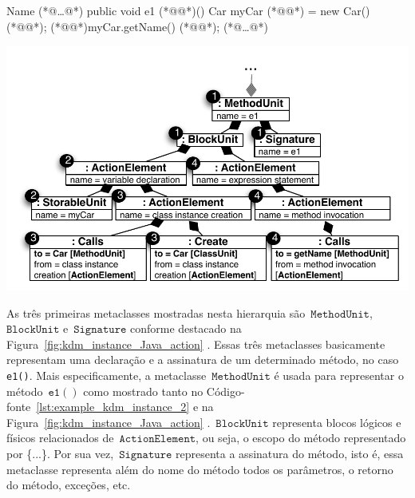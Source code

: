 
\noindent\begin{minipage}{.43\textwidth}
	\begin{codigo}[caption={[Pedaço de código Java para ilustrar como o pacote~$\mathtt{Action}$ funciona.] Método \texttt{e1} ilustrando como o Pacote \texttt{Action} funciona.}, escapeinside={(*@}{@*)}, basicstyle=\footnotesize, label={lst:example_kdm_instance_2}]{Name}
	(*@\ldots @*)
	public void e1 (*@@*)(){
	Car myCar (*@@*) = new Car() (*@@*);
	(*@@*)myCar.getName() (*@@*);
	}
	(*@\ldots @*)
	\end{codigo}
\end{minipage}\hfill
\begin{minipage}{.65\textwidth}
	\centering
	\includegraphics[scale=0.6]{images/actionInstanceKDM_2}
	\fautor
	\label{fig:kdm_instance_Java_action}
\end{minipage}

As três primeiras metaclasses mostradas nesta hierarquia são~$\mathtt{MethodUnit}$,~$\mathtt{BlockUnit}$ e~$\mathtt{Signature}$ conforme destacado na  Figura~\ref{fig:kdm_instance_Java_action} . Essas três metaclasses basicamente representam uma declaração e a assinatura de um determinado método, no caso \texttt{e1()}. Mais especificamente, a metaclasse~$\mathtt{MethodUnit}$ é usada para representar o método~$\mathtt{e1()}$ como mostrado tanto no Código-fonte~\ref{lst:example_kdm_instance_2}  e na Figura~\ref{fig:kdm_instance_Java_action} .~$\mathtt{BlockUnit}$ representa blocos lógicos e físicos relacionados de~$\mathtt{ActionElement}$, ou seja, o escopo do método representado por \{...\}. Por sua vez,~$\mathtt{Signature}$ representa a assinatura do método, isto é, essa metaclasse representa além do nome do método todos os parâmetros, o retorno do método, exceções, etc.	

